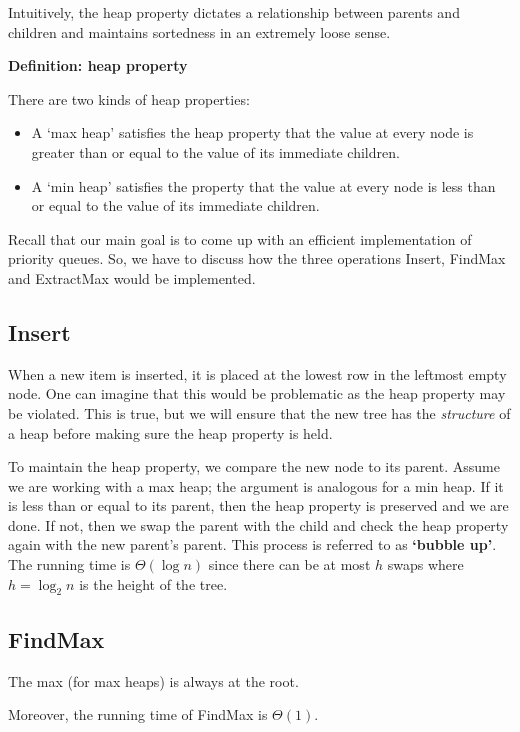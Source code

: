\documentclass[11pt]{article}
\begin{document}
Intuitively, the heap property dictates a relationship between parents and children and maintains sortedness in an extremely loose sense. 

\textbf{Definition: heap property}

There are two kinds of heap properties: 
\begin{itemize}
    \item A `max heap' satisfies the heap property that the value at every node is greater than or equal to the value of its immediate children. 
    \item A `min heap' satisfies the property that the value at every node is less than or equal to the value of its immediate children. 
\end{itemize}

Recall that our main goal is to come up with an efficient implementation of priority queues. So, we have to discuss how the three operations Insert, FindMax and ExtractMax would be implemented. 

\subsection{Insert}
When a new item is inserted, it is placed at the lowest row in the leftmost empty node. One can imagine that this would be problematic as the heap property may be violated. This is true, but we will ensure that the new tree has the \emph{structure} of a heap before making sure the heap property is held. 

To maintain the heap property, we compare the new node to its parent. Assume we are working with a max heap; the argument is analogous for a min heap. If it is less than or equal to its parent, then the heap property is preserved and we are done. If not, then we swap the parent with the child and check the heap property again with the new parent's parent. This process is referred to as \textbf{`bubble up'}. The running time is $\Theta(\log n)$ since there can be at most $h$ swaps where $h = \log_2 n$ is the height of the tree. 

\subsection{FindMax}
The max (for max heaps) is always at the root. 

Moreover, the running time of FindMax is $\Theta(1)$. 
\end{document}
